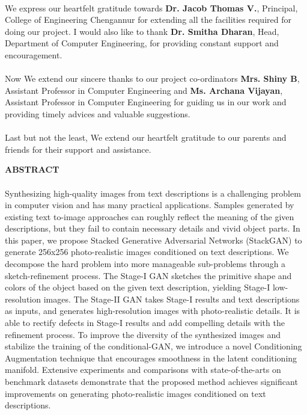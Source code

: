 \documentclass[a4paper,12pt,oneside]{article}
\begin{document}
\paragraph{}
We express our heartfelt gratitude towards \textbf{Dr. Jacob Thomas V.}, Principal, College
of Engineering Chengannur for extending all the facilities required for doing our project.
I would also like to thank \textbf{Dr. Smitha Dharan}, Head, Department of Computer
Engineering, for providing constant support and encouragement.
\paragraph{}
Now We extend our sincere thanks to our project co-ordinators \textbf{Mrs. Shiny B}, Assistant
Professor in Computer Engineering and \textbf{Ms. Archana Vijayan}, Assistant Professor in Computer Engineering for guiding us in our work and providing timely
advices and valuable suggestions.
\paragraph{}
Last but not the least, We extend our heartfelt gratitude to our parents and friends for
their support and assistance.	

\newpage
\begin{center}
\large{\textbf{ABSTRACT}}
\end{center}
\vspace{4ex}
\paragraph{}
Synthesizing high-quality images from text descriptions is a challenging problem in computer vision and has many practical applications. Samples generated by existing text to-image approaches can roughly reflect the meaning of the given descriptions, but they fail to contain necessary details and vivid object parts. In this paper, we propose Stacked Generative Adversarial Networks (StackGAN) to generate 256x256 photo-realistic images conditioned on text descriptions. We decompose the hard problem into more manageable sub-problems through a sketch-refinement process. The Stage-I GAN sketches the primitive shape and colors of the object based on the given text description, yielding Stage-I low-resolution images. The Stage-II GAN takes Stage-I results and text descriptions as inputs, and generates high-resolution images with photo-realistic details. It is able to rectify defects in Stage-I results and add compelling details with the refinement process. To improve the diversity of the synthesized images and stabilize the training of the conditional-GAN, we introduce a novel Conditioning Augmentation technique that encourages smoothness in the latent conditioning manifold. Extensive experiments and comparisons with state-of-the-arts on benchmark datasets demonstrate that the proposed method achieves significant improvements on generating photo-realistic images conditioned on text descriptions. 
\end{document}
